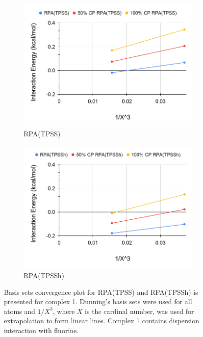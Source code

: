 \documentclass[11pt]{article}
\begin{document}
\begin{figure}[hbpt]
  \centering
  \begin{subfigure}{.5\textwidth}
    \centering
    \includegraphics[scale=0.3]{tpss-1.png}
    \caption{RPA(TPSS)}
    \label{fig:tpss_1}
  \end{subfigure}%
  \begin{subfigure}{.5\textwidth}
    \centering
    \includegraphics[scale=0.3]{tpssh-1.png}
    \caption{RPA(TPSSh)}
    \label{fig:tpssh_1}
  \end{subfigure}
  \caption{Basis sets convergence plot for RPA(TPSS) and RPA(TPSSh) is
    presented for complex 1. Dunning's basis sets were used for all atoms
    and $1/X^3$, where $X$ is the cardinal number, was used for
    extrapolation to form linear lines. Complex 1 contains dispersion
    interaction with fluorine.}
  \label{fig:complex_1}
\end{figure}
\end{document}
